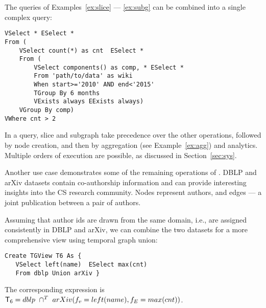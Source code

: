 The queries of Examples~\ref{ex:slice} --- \ref{ex:subg} can be
combined into a single complex query:

\begin{small}
\begin{verbatim}
VSelect * ESelect *
From (
    VSelect count(*) as cnt  ESelect *
    From (
        VSelect components() as comp, * ESelect *
        From 'path/to/data' as wiki
        When start>='2010' AND end<'2015' 
        TGroup By 6 months
        VExists always EExists always)
    VGroup By comp)
VWhere cnt > 2 
\end{verbatim}
\vspace{-0.1cm}
\end{small}

In a \ql query, slice and subgraph take precedence over the other
operations, followed by node creation, and then by aggregation (see
Example~\ref{ex:agg}) and analytics.  Multiple orders of execution are
possible, as discussed in Section~\ref{sec:sys}.


Another use case demonstrates some of the remaining operations of
\tga.  DBLP and arXiv datasets contain co-authorship information and
can provide interesting insights into the CS research community.
Nodes represent authors, and edges --- a joint publication between a
pair of authors.

\begin{example}
\label{ex:union}
\vspace{-0.1cm}

Assuming that author ids are drawn from the same domain, i.e., are
assigned consistently in DBLP and arXiv, we can combine the two
datasets for a more comprehensive view using temporal graph union:

\begin{small}
\begin{verbatim}
Create TGView T6 As {
   VSelect left(name)  ESelect max(cnt)
   From dblp Union arXiv }
\end{verbatim}
\vspace{-0.1cm}
\end{small}

The corresponding \tga expression is\\$\mathsf{T}_6 = dblp~\cap^T~arXiv(f_v=left(name),f_E=max(cnt))$.
\vspace{-0.1cm}
\end{example}

